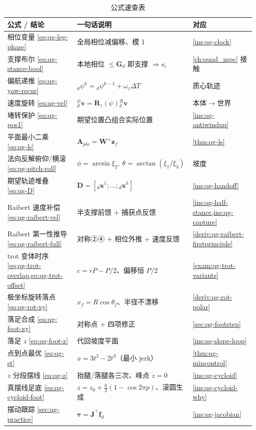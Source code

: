 \begin{table}[H]\centering\small
\caption{公式速查表}
\begin{tabular}{lll}
\toprule
公式 / 结论 & 一句话说明 & 对应 \\
\midrule
相位变量 \cref{eq:qg-leg-phase} & 全局相位减偏移、模 1 & \cref{ins:qg-clock} \\
支撑布尔 \cref{eq:qg-stance-bool} & 本地相位 $\le\mathbf{G}_d$ 即支撑 $\Rightarrow s_i$ & \cref{ch:quad_mpc} 接触 \\
偏航递推 \cref{eq:qg-yaw-recur} & ${}_d\psi^k={}_d\psi^{k-1}+\omega_z\Delta T$ & 质心轨迹 \\
速度旋转 \cref{eq:qg-vel} & ${}_d^{\mathcal{O}}\boldsymbol{v}=\mathbf{R}_z(\psi){}_d^{\mathcal{B}}\boldsymbol{v}$ & 本体$\to$世界 \\
堵转保护 \cref{eq:qg-pos1} & 期望位置凸组合实际位置 & \cref{ins:qg-antiwindup} \\
平面最小二乘 \cref{eq:qg-ls} & $\mathbf{A}_{pla}=\mathbf{W}^{+}\boldsymbol{z}_f$ & \cref{thm:qg-ls} \\
法向反解俯仰/横滚 \cref{eq:qg-pitch-roll} & $\phi=\arcsin\xi_2,\ \theta=\arctan(\xi_1/\xi_3)$ & 坡度 \\
期望轨迹堆叠 \cref{eq:qg-D} & $\mathbf{D}=[{}_d\boldsymbol{x}^1;\dots;{}_d\boldsymbol{x}^h]$ & \cref{ins:qg-handoff} \\
Raibert 速度补偿 \cref{eq:qg-raibert-vel} & 半支撑前馈 + 捕获点反馈 & \cref{ins:qg-half-stance,ins:qg-capture} \\
Raibert 第一性推导 \cref{eq:qg-raibert-full} & 对称②④ + 相位外推 + 速度反馈 & \cref{deriv:qg-raibert-firstprinciple} \\
trot 变体时序 \cref{eq:qg-trot-overlap,eq:qg-trot-offset} & $c=rP-P/2$、偏移恒 $P/2$ & \cref{exam:qg-trot-variants} \\
极坐标旋转落点 \cref{eq:qg-rot-xy} & $x_f=R\cos\theta_f$、半径不漂移 & \cref{deriv:qg-rot-polar} \\
落足合成 \cref{eq:qg-foot-xy} & 对称点 + 四项修正 & \cref{sec:qg-footstep} \\
落足 $z$ \cref{eq:qg-foot-z} & 代回坡度平面 & \cref{ins:qg-slope-loop} \\
点到点最优 \cref{eq:qg-st} & $x=3t^2-2t^3$（最小 jerk） & \cref{thm:qg-mincontrol} \\
$z$ 分段摆线 \cref{eq:qg-z} & 抬腿/落腿各三次、峰点 $\dot z=0$ & \cref{ins:qg-cycloid} \\
真摆线足底 \cref{eq:qg-cycloid-foot} & $z=z_0+\tfrac{h}{2}(1-\cos2\pi p)$、滚圆生成 & \cref{ins:qg-cycloid-why} \\
摆动跟踪 \cref{sec:qg-practice} & $\boldsymbol{\tau}=\mathbf{J}^\top\boldsymbol{f}_d$ & \cref{ins:qg-jacobian} \\
\bottomrule
\end{tabular}
\end{table}


